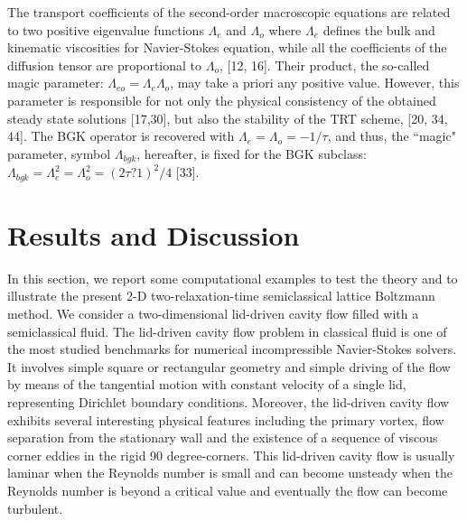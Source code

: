 \documentclass[doublecol]{epl2}
\begin{document}
The transport coefficients of the second-order macroscopic equations are related to two positive eigenvalue functions $\Lambda_e$ and $\Lambda_o$
where $\Lambda_e$ defines the bulk and kinematic viscosities for Navier-Stokes equation, while all the coefficients of the diffusion tensor are proportional to $\Lambda_o$, [12, 16].  Their product, the so-called magic parameter: $\Lambda_{eo} =\Lambda_e \Lambda_o$, may take a priori any positive value. 
However, this parameter is responsible for not only the physical consistency of the obtained steady state solutions [17,30], but also the stability of the TRT scheme, [20, 34, 44].  The BGK operator is recovered with $\Lambda_e = \Lambda_o = - 1/\tau$, and thus, the ``magic" parameter, symbol $\Lambda_{bgk}$, hereafter, is fixed for the BGK subclass: $\Lambda_{bgk} = \Lambda_e^2 =\Lambda_o^2 =(2\tau ?1)^2/4$ [33].

\section{Results and Discussion}

In this section, we report some computational examples to test the theory and to illustrate the present 2-D two-relaxation-time semiclassical lattice Boltzmann method. We consider a two-dimensional lid-driven cavity flow filled with a semiclassical fluid. The lid-driven cavity flow problem in classical fluid is one of the most studied benchmarks for numerical incompressible Navier-Stokes solvers. It involves simple square or rectangular geometry and simple driving of the flow by means of the tangential motion with constant velocity of a single lid, representing Dirichlet boundary conditions. Moreover, the lid-driven cavity flow exhibits several interesting physical features including the primary vortex, flow separation from the stationary wall and the existence of a sequence of viscous corner eddies in the rigid 90 degree-corners. This lid-driven cavity flow is usually laminar when the Reynolds number is small and can become unsteady when the Reynolds number is beyond a critical value and eventually the flow can become turbulent.
\end{document}

